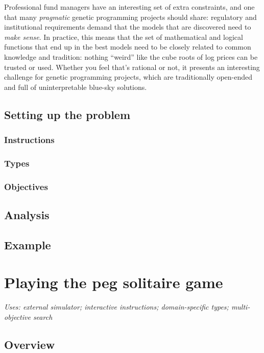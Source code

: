 \documentclass[12pt]{article}
\begin{document}
Professional fund managers have an interesting set of extra constraints, and one that many \emph{pragmatic} genetic programming projects should share: regulatory and institutional requirements demand that the models that are discovered need to \emph{make sense}. In practice, this means that the set of mathematical and logical functions that end up in the best models need to be closely related to common knowledge and tradition: nothing ``weird'' like the cube roots of log prices can be trusted or used. Whether you feel that's rational or not, it presents an interesting challenge for genetic programming projects, which are traditionally open-ended and full of uninterpretable blue-sky solutions.

\subsection{Setting up the problem}

\subsubsection{Instructions}

\subsubsection{Types}

\subsubsection{Objectives}

\subsection{Analysis}

\subsection{Example}

\section{Playing the peg solitaire game}

\textit{Uses: external simulator; interactive instructions; domain-specific types; multi-objective search}

\subsection{Overview}
\end{document}
